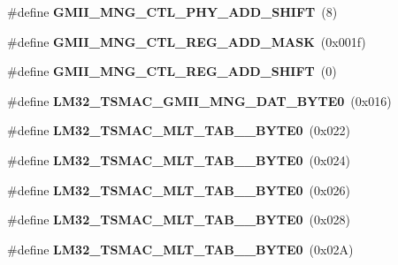 \begin{DoxyCompactItemize}
\mbox{\label{group__lm32__tsmac_ga287802f9a2fc94750bfc94e26a425c26}} 
\#define {\bfseries G\+M\+I\+I\+\_\+\+M\+N\+G\+\_\+\+C\+T\+L\+\_\+\+P\+H\+Y\+\_\+\+A\+D\+D\+\_\+\+S\+H\+I\+FT}~(8)
\item 
\mbox{\label{group__lm32__tsmac_ga014b67163f61af3a5a77b0af013f95b1}} 
\#define {\bfseries G\+M\+I\+I\+\_\+\+M\+N\+G\+\_\+\+C\+T\+L\+\_\+\+R\+E\+G\+\_\+\+A\+D\+D\+\_\+\+M\+A\+SK}~(0x001f)
\item 
\mbox{\label{group__lm32__tsmac_ga2fcfd977578fd223deafc1a7a0f8e287}} 
\#define {\bfseries G\+M\+I\+I\+\_\+\+M\+N\+G\+\_\+\+C\+T\+L\+\_\+\+R\+E\+G\+\_\+\+A\+D\+D\+\_\+\+S\+H\+I\+FT}~(0)
\item 
\mbox{\label{group__lm32__tsmac_ga1dbe831cbaae9dc791f2c6c928c8b946}} 
\#define {\bfseries L\+M32\+\_\+\+T\+S\+M\+A\+C\+\_\+\+G\+M\+I\+I\+\_\+\+M\+N\+G\+\_\+\+D\+A\+T\+\_\+\+B\+Y\+T\+E0}~(0x016)
\item 
\mbox{\label{group__lm32__tsmac_gad31d065fb99d5978003fdc874a8054b9}} 
\#define {\bfseries L\+M32\+\_\+\+T\+S\+M\+A\+C\+\_\+\+M\+L\+T\+\_\+\+T\+A\+B\+\_\+\_\+\+B\+Y\+T\+E0}~(0x022)
\item 
\mbox{\label{group__lm32__tsmac_gaadade352fd4a37a7629484ac9a24e45d}} 
\#define {\bfseries L\+M32\+\_\+\+T\+S\+M\+A\+C\+\_\+\+M\+L\+T\+\_\+\+T\+A\+B\+\_\+\_\+\+B\+Y\+T\+E0}~(0x024)
\item 
\mbox{\label{group__lm32__tsmac_ga42fcd922786986ecc46c658df4cb44bf}} 
\#define {\bfseries L\+M32\+\_\+\+T\+S\+M\+A\+C\+\_\+\+M\+L\+T\+\_\+\+T\+A\+B\+\_\+\_\+\+B\+Y\+T\+E0}~(0x026)
\item 
\mbox{\label{group__lm32__tsmac_gaf2d64268b4784b19528863c338c3917b}} 
\#define {\bfseries L\+M32\+\_\+\+T\+S\+M\+A\+C\+\_\+\+M\+L\+T\+\_\+\+T\+A\+B\+\_\+\_\+\+B\+Y\+T\+E0}~(0x028)
\item 
\mbox{\label{group__lm32__tsmac_ga347f62b4b59c45eddbd9935b579f1cb1}} 
\#define {\bfseries L\+M32\+\_\+\+T\+S\+M\+A\+C\+\_\+\+M\+L\+T\+\_\+\+T\+A\+B\+\_\+\_\+\+B\+Y\+T\+E0}~(0x02\+A)

\end{DoxyCompactItemize}
